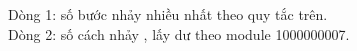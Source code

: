 Dòng 1: số bước nhảy nhiều nhất theo quy tắc trên.   
\\   Dòng 2: số cách nhảy , lấy dư theo module 1000000007.